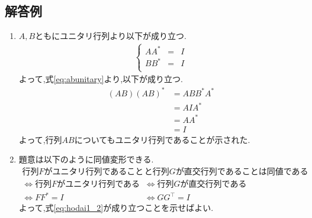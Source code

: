 \documentclass[dvipdfmx,titlepage, 11pt, a4paper]{jsarticle}%
\begin{document}
\newpage

\subsection{解答例}
\begin{enumerate}[(1)]
    \setlength{\itemsep}{10pt}
    \item $A, B$ともにユニタリ行列より以下が成り立つ.
    \begin{align}
        \left\{
            \begin{array}{lcl}
            AA^{\ast} &=& I\\ 
            BB^{\ast} &=& I\\ 
            \end{array}
        \right.\label{eq:abunitary}
    \end{align}
    よって,式\eqref{eq:abunitary}より,以下が成り立つ.
    \begin{align*}
        (AB)(AB)^{\ast} & = ABB^{\ast}A^{\ast}\\
                        & = AIA^{\ast}\\
                        & = AA^{\ast}\\
                        & = I
    \end{align*}
    よって,行列$AB$についてもユニタリ行列であることが示された.
    \item 題意は以下のように同値変形できる.
    \begin{align}
        \mbox{行列$F$がユニタリ行列であること}&\mbox{と行列$G$が直交行列であることは同値である}\nonumber\\
        \Longleftrightarrow \mbox{行列$F$がユニタリ行列である} &\Leftrightarrow \mbox{行列$G$が直交行列である} \nonumber\\
        \Longleftrightarrow FF^{\ast} = I &\Leftrightarrow GG^{\top} = I\label{eq:hodai1_2}
    \end{align}
    よって,式\eqref{eq:hodai1_2}が成り立つことを示せばよい.


\end{enumerate}
\end{document}
